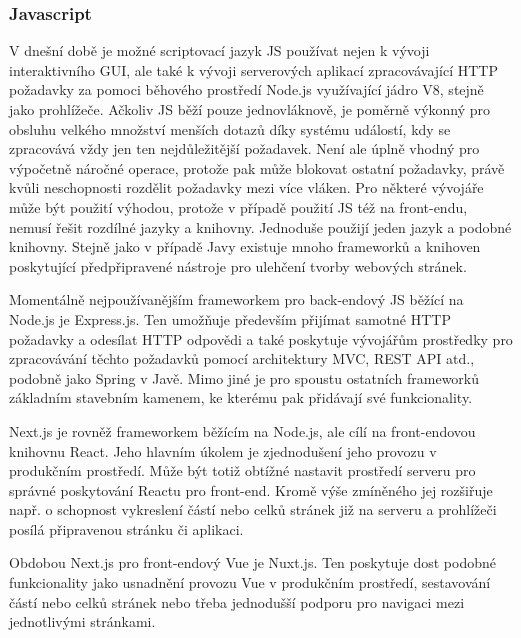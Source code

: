 		\subsubsection{Javascript}

		V dnešní době je možné scriptovací jazyk \ac{JS} používat nejen k vývoji interaktivního \Ac{GUI},
		ale také k vývoji serverových aplikací zpracovávající \Ac{HTTP} požadavky za pomoci běhového prostředí Node.js
		využívající jádro V8, stejně jako prohlížeče. \cite{express_node_introduction}
		Ačkoliv \ac{JS} běží pouze jednovláknově, je poměrně výkonný pro obsluhu velkého množství menších dotazů díky
		systému událostí, kdy se zpracovává vždy jen ten nejdůležitější požadavek.
		Není ale úplně vhodný pro výpočetně náročné operace, protože pak může blokovat ostatní požadavky, právě kvůli
		neschopnosti rozdělit požadavky mezi více vláken. \cite{js_eventloop}
		Pro některé vývojáře může být použití výhodou, protože v případě použití \ac{JS} též na front-endu,
		nemusí řešit rozdílné jazyky a knihovny.
		Jednoduše použijí jeden jazyk a podobné knihovny.
		Stejně jako v případě Javy existuje mnoho frameworků a knihoven poskytující předpřipravené nástroje pro ulehčení
		tvorby webových stránek.

		Momentálně nejpoužívanějším frameworkem pro back-endový \ac{JS} běžící na Node.js je Express.js. \cite{state_of_js_2020}
		Ten umožňuje především přijímat samotné \Ac{HTTP} požadavky a odesílat \Ac{HTTP} odpovědi a také poskytuje vývojářům
		prostředky pro zpracovávání těchto požadavků pomocí architektury \Ac{MVC}, \Ac{REST} API atd., podobně
		jako Spring v Javě.
		Mimo jiné je pro spoustu ostatních frameworků základním stavebním kamenem, ke kterému pak přidávají
		své funkcionality. \cite{express_node_introduction}

		Next.js je rovněž frameworkem běžícím na Node.js, ale cílí na front-endovou knihovnu React.
		Jeho hlavním úkolem je zjednodušení jeho provozu v produkčním prostředí.
		Může být totiž obtížné nastavit prostředí serveru pro správné poskytování Reactu pro front-end.
		Kromě výše zmíněného jej rozšiřuje např. o schopnost vykreslení částí nebo celků stránek již na serveru a
		prohlížeči posílá připravenou stránku či aplikaci. \cite{create_nextjs_app}

		Obdobou Next.js pro front-endový Vue je Nuxt.js.
		Ten poskytuje dost podobné funkcionality jako usnadnění provozu Vue v produkčním prostředí, sestavování
		částí nebo celků stránek nebo třeba jednodušší podporu pro navigaci mezi jednotlivými stránkami. \cite{nuxtjs}

